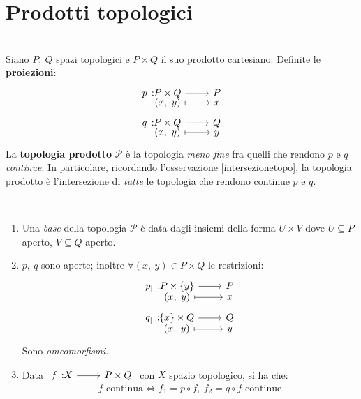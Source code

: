 \section{Prodotti topologici}
\begin{define}~{}\\
Siano $P,\ Q$ spazi topologici e $P\times Q$ il suo prodotto cartesiano. Definite le \textbf{proiezioni}:
\begin{gather}
\funztot{p}{P\times Q}{P}{\left(x,\ y\right)}{x}\\
\funztot{q}{P\times Q}{Q}{\left(x,\ y\right)}{y}
\end{gather}
La \textbf{topologia prodotto} $\mathcal{P}$ è la topologia \textit{meno fine} fra quelli che rendono $p$ e $q$ \textit{continue}. In particolare, ricordando l'osservazione \ref{intersezionetopo}, la topologia prodotto è l'intersezione di \textit{tutte} le topologia che rendono continue $p$ e $q$.
\end{define}
\begin{theorema}\label{topprodotto}~{}
\begin{enumerate}
\item Una \textit{base} della topologia $\mathcal{P}$ è data dagli insiemi della forma $U\times V$ dove $U\subseteq P$ aperto, $V\subseteq Q$ aperto.
\item $p,\ q$ sono aperte; inoltre $\forall \left(x,\ y\right)\in P\times Q$ le restrizioni:
\begin{gather}
\funztot{p_{\mid}}{P\times \left\{y\right\}}{P}{\left(x,\ y\right)}{x}\\
\funztot{q_{\mid}}{\left\{x\right\}\times Q}{Q}{\left(x,\ y\right)}{y}
\end{gather}
Sono \textit{omeomorfismi}.\\
\item Data $\funz{f}{X}{P\times Q}$ con $X$ spazio topologico, si ha che:
\begin{equation}
f\text{ continua}\iff f_1=p\circ f,\ f_2=q\circ f\text{ continue}
\end{equation}
\end{enumerate}
\vspace{-6mm}
\end{theorema}
